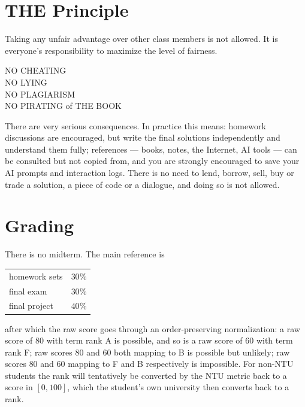 \documentclass[a4paper,oneside]{scrbook}
\begin{document}
\section*{THE Principle}

Taking any unfair advantage over other class members is not allowed. It is
everyone's responsibility to maximize the level of fairness.

\begin{moral}
    \begin{center}
        NO CHEATING \\ NO LYING \\ NO PLAGIARISM \\ NO PIRATING of THE BOOK
    \end{center}
\end{moral}

There are very serious consequences. In practice this means: homework discussions
are encouraged, but write the final solutions independently and understand them
fully; references --- books, notes, the Internet, AI tools --- can be consulted
but not copied from, and you are strongly encouraged to save your AI prompts and
interaction logs. There is no need to lend, borrow, sell, buy or trade a
solution, a piece of code or a dialogue, and doing so is not allowed.

\section*{Grading}

There is no midterm. The main reference is
\begin{center}
    \begin{tabular}{@{}lr@{}}
        \toprule
        homework sets & \(30\%\)\\
        final exam    & \(30\%\)\\
        final project & \(40\%\)\\
        \bottomrule
    \end{tabular}
\end{center}
after which the raw score goes through an order-preserving normalization: a raw
score of \(80\) with term rank A is possible, and so is a raw score of \(60\)
with term rank F; raw scores \(80\) and \(60\) both mapping to B is possible but
unlikely; raw scores \(80\) and \(60\) mapping to F and B respectively is
impossible. For non-NTU students the rank will tentatively be converted by the
NTU metric back to a score in \([0, 100]\), which the student's own university
then converts back to a rank.
\end{document}
